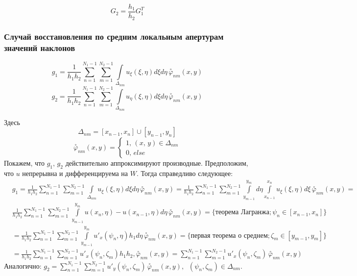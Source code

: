 \documentclass{article}
\begin{document}
$$G_2 = \frac{h_1}{h_2} G_1^T$$

\subsubsection{Случай восстановления по средним локальным апертурам значений наклонов}
\begin{equation}\label{g_1}
g_1 = \frac{1}{h_1h_2} \sum \limits_{n=1}^{N_1 - 1} \sum \limits_{m=1}^{N_2 - 1} \int \limits _{\Delta_{nm}} u_\xi(\xi,\eta) d\xi d\eta \,\overset{\circ}{\varphi}_{nm}(x,y)
\end{equation}
\begin{equation}\label{g_2}
g_2 = \frac{1}{h_1h_2} \sum \limits_{n=1}^{N_1 - 1} \sum \limits_{m=1}^{N_2 - 1} \int \limits _{\Delta_{nm}} u_\eta(\xi,\eta) d\xi d\eta \, \overset{\circ}{\varphi}_{nm}(x,y)
\end{equation}

Здесь
$$\Delta_{nm} = [x_{n-1}, x_n] \cup [y_{n-1}, y_n] $$
$$\overset{\circ}{\varphi}_{nm}(x,y) = \begin{cases} 1, \, (x,\,y) \in \Delta_{nm} \\ 0, \, else\end{cases}$$
Покажем, что $g_1,\, g_2$ действительно аппроксимируют производные. Предположим, что $u$ непрерывна и дифференцируема на $W$. Тогда справедливо следующее:
\begin{align*}
&g_1 = \frac{1}{h_1h_2} \sum \limits_{n=1}^{N_1 - 1} \sum \limits_{m=1}^{N_2 - 1} \int \limits _{\Delta_{nm}} u_\xi(\xi,\eta) d\xi d\eta \, \overset{\circ}{\varphi}_{nm}(x,y) = 
\frac{1}{h_1h_2} \sum \limits_{n=1}^{N_1 - 1} \sum \limits_{m=1}^{N_2 - 1} \int \limits _{y_{m-1}}^{y_m}  d\eta \int \limits_{x_{n-1}}^{x_n} u_\xi(\xi,\eta) d\xi \, \overset{\circ}{\varphi}_{nm}(x,y) =\\&  
\frac{1}{h_1h_2} \sum \limits_{n=1}^{N_1 - 1} \sum \limits_{m=1}^{N_2 - 1} \int \limits _{y_{m-1}}^{y_m} u(x_n,\eta) - u(x_{n-1}, \eta) d\eta\, \overset{\circ}{\varphi}_{nm}(x,y) = \{\text{теорема Лагранжа};\psi_n \in [x_{n-1}, x_n] \} \\&=
\frac{1}{h_1h_2} \sum \limits_{n=1}^{N_1 - 1} \sum \limits_{m=1}^{N_2 - 1} \int \limits _{y_{m-1}}^{y_m} u'_x(\psi_n,\eta)h_1 d\eta\, \overset{\circ}{\varphi}_{nm}(x,y) = \{ \text{первая теорема о среднем}; \zeta_m \in [y_{m-1}, y_m] \} \\&= 
\frac{1}{h_1h_2} \sum \limits_{n=1}^{N_1 - 1} \sum \limits_{m=1}^{N_2 - 1} u'_x(\psi_n,\zeta_m)h_1 h_2, \overset{\circ}{\varphi}_{nm}(x,y) = 
\sum \limits_{n=1}^{N_1 - 1} \sum \limits_{m=1}^{N_2 - 1} u'_x(\psi_n,\zeta_m) \, \overset{\circ}{\varphi}_{nm}(x,y)
\end{align*}
Аналогично:
$g_2 = \sum \limits_{n=1}^{N_1 - 1} \sum \limits_{m=1}^{N_2 - 1} u'_y(\psi_n,\zeta_m) \, \overset{\circ}{\varphi}_{nm}(x,y), \;\;(\psi_n, \zeta_m) \in \Delta_{nm}$.
\end{document}
